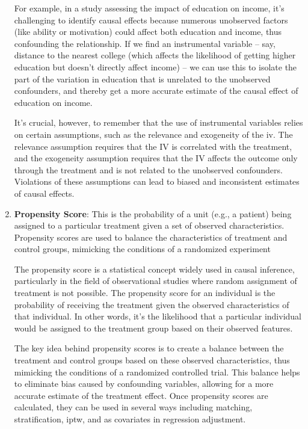 \begin{enumerate}
    For example, in a study assessing the impact of education on income, it's challenging to identify causal effects because numerous unobserved factors (like ability or motivation) could affect both education and income, thus confounding the relationship. If we find an instrumental variable – say, distance to the nearest college (which affects the likelihood of getting higher education but doesn't directly affect income) – we can use this to isolate the part of the variation in education that is unrelated to the unobserved confounders, and thereby get a more accurate estimate of the causal effect of education on income.
    
    It's crucial, however, to remember that the use of instrumental variables relies on certain assumptions, such as the relevance and exogeneity of the \ac{iv}. The relevance assumption requires that the IV is correlated with the treatment, and the exogeneity assumption requires that the IV affects the outcome only through the treatment and is not related to the unobserved confounders. Violations of these assumptions can lead to biased and inconsistent estimates of causal effects.
    
    \item \textbf{Propensity Score}: This is the probability of a unit (e.g., a patient) being assigned to a particular treatment given a set of observed characteristics. Propensity scores are used to balance the characteristics of treatment and control groups, mimicking the conditions of a randomized experiment \cite{austinIntroductionPropensityScore2011b,austinPerformanceDifferentPropensityscore2010}
    
    The propensity score is a statistical concept widely used in causal inference, particularly in the field of observational studies where random assignment of treatment is not possible. The propensity score for an individual is the probability of receiving the treatment given the observed characteristics of that individual. In other words, it's the likelihood that a particular individual would be assigned to the treatment group based on their observed features.
    
    The key idea behind propensity scores is to create a balance between the treatment and control groups based on these observed characteristics, thus mimicking the conditions of a randomized controlled trial. This balance helps to eliminate bias caused by confounding variables, allowing for a more accurate estimate of the treatment effect. Once propensity scores are calculated, they can be used in several ways including matching, stratification, \ac{iptw}, and as covariates in regression adjustment.
    

\end{enumerate}
